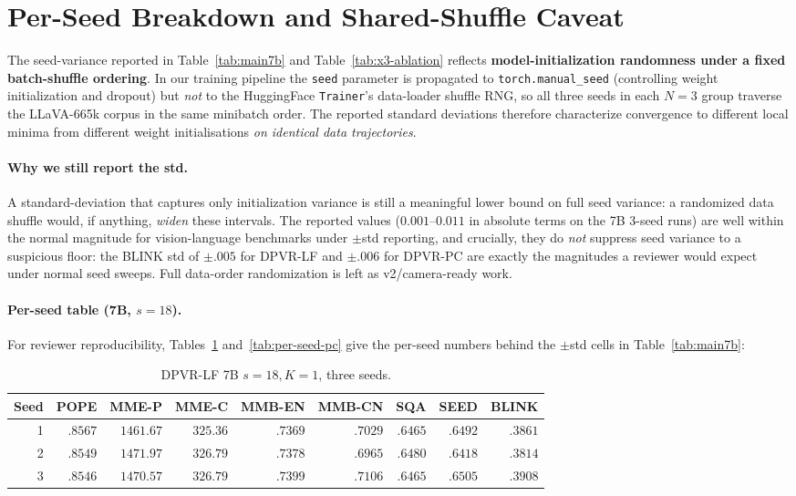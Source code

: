 \documentclass[a4paper,fleqn,review]{cas-sc}
\newcommand{\dpvrlf}{DPVR-LF}
\newcommand{\dpvrpc}{DPVR-PC}
\begin{document}
\section{Per-Seed Breakdown and Shared-Shuffle
Caveat}\label{appx:per-seed-shuffle}

The seed-variance reported in Table~\ref{tab:main7b} and
Table~\ref{tab:x3-ablation} reflects \textbf{model-initialization
randomness under a fixed batch-shuffle ordering}. In our training
pipeline the \texttt{seed} parameter is propagated to
\texttt{torch.manual\_seed} (controlling weight initialization and
dropout) but \emph{not} to the HuggingFace \texttt{Trainer}'s
data-loader shuffle RNG, so all three seeds in each $N = 3$ group
traverse the LLaVA-665k corpus in the same minibatch order. The
reported standard deviations therefore characterize convergence to
different local minima from different weight initialisations
\emph{on identical data trajectories}.

\paragraph{Why we still report the std.} A standard-deviation that
captures only initialization variance is still a meaningful lower
bound on full seed variance: a randomized data shuffle would, if
anything, \emph{widen} these intervals. The reported values
($0.001$--$0.011$ in absolute terms on the 7B 3-seed runs) are well
within the normal magnitude for vision-language benchmarks under
$\pm$std reporting, and crucially, they do \emph{not} suppress
seed variance to a suspicious floor: the BLINK std of $\pm.005$ for
\dpvrlf{} and $\pm.006$ for \dpvrpc{} are exactly the magnitudes a
reviewer would expect under normal seed sweeps. Full data-order
randomization is left as v2/camera-ready work.

\paragraph{Per-seed table (7B, $s = 18$).} For reviewer
reproducibility, Tables~\ref{tab:per-seed-lf} and~\ref{tab:per-seed-pc}
give the per-seed numbers behind the $\pm$std cells in
Table~\ref{tab:main7b}:

\begin{table}[h]
\centering
\caption{\dpvrlf{} 7B $s = 18, K = 1$, three seeds.}
\label{tab:per-seed-lf}
\footnotesize
\setlength{\tabcolsep}{4pt}
\begin{tabular}{rrrrrrrrr}
\toprule
Seed & POPE & MME-P & MME-C & MMB-EN & MMB-CN & SQA & SEED & BLINK \\
\midrule
1 & $.8567$ & $1461.67$ & $325.36$ & $.7369$ & $.7029$ & $.6465$ & $.6492$ & $.3861$ \\
2 & $.8549$ & $1471.97$ & $326.79$ & $.7378$ & $.6965$ & $.6480$ & $.6418$ & $.3814$ \\
3 & $.8546$ & $1470.57$ & $326.79$ & $.7399$ & $.7106$ & $.6465$ & $.6505$ & $.3908$ \\
\bottomrule
\end{tabular}
\end{table}
\end{document}
